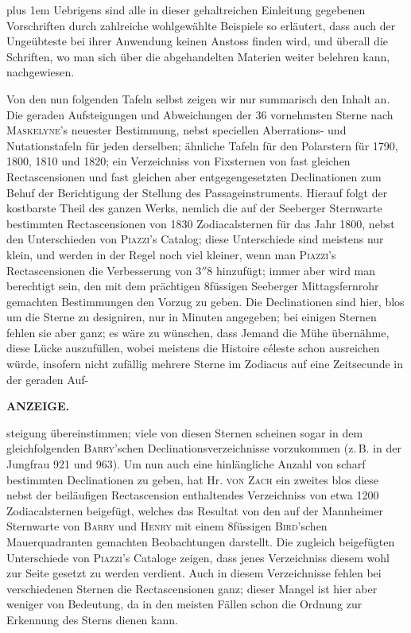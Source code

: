 \begingroup\rightskip=0pt plus 1em
Uebrigens sind alle in dieser gehaltreichen Einleitung gegebenen Vorschriften durch zahlreiche wohlgewählte Beispiele so erläutert, dass auch der Ungeübteste bei ihrer Anwendung keinen Anstoss finden wird, und überall die Schriften, wo man sich über die abgehandelten Materien weiter belehren kann, nachgewiesen.\par\endgroup

Von den nun folgenden Tafeln selbst zeigen wir nur summarisch den Inhalt an. Die geraden Aufsteigungen und Abweichungen der 36 vornehmsten Sterne nach \textsc{Maskelyne}'s neuester Bestimmung, nebst speciellen Aberrations- und Nutationstafeln für jeden derselben; ähnliche Tafeln für den Polarstern für 1790, 1800, 1810 und 1820; ein Verzeichniss von Fixsternen von fast gleichen Rectascensionen und fast gleichen aber entgegengesetzten Declinationen zum Behuf der Berichtigung der Stellung des Passageinstruments. Hierauf folgt der kostbarste Theil des ganzen Werks, nemlich die auf der Seeberger Sternwarte bestimmten Rectascensionen von 1830 Zodiacalsternen für das Jahr 1800, nebst den Unterschieden von \textsc{Piazzi}'s Catalog; diese Unterschiede sind meistens nur klein, und werden in der Regel noch viel kleiner, wenn man \textsc{Piazzi}'s Rectascensionen die Verbesserung von $3''8$ hinzufügt; immer aber wird man berechtigt sein, den mit dem prächtigen 8füssigen Seeberger Mittagsfernrohr gemachten Bestimmungen den Vorzug zu geben. Die Declinationen sind hier, blos um die Sterne zu designiren, nur in Minuten angegeben; bei einigen Sternen fehlen sie aber ganz; es wäre zu wünschen, dass Jemand die Mühe übernähme, diese Lücke auszufüllen, wobei meistens die Histoire céleste schon ausreichen würde, insofern nicht zufällig mehrere Sterne im Zodiacus auf eine Zeitsecunde in der geraden Auf-\par
\clearpage
\noindent{}%
%
\parbox[t]{\dimexpr\linewidth-24mm\relax}{\centering\footnotesize\bfseries ANZEIGE.\par}%
\makebox[12mm][r]{}\par\nobreak\medskip
\noindent steigung übereinstimmen; viele von diesen Sternen scheinen sogar in dem gleichfolgenden \textsc{Barry}'schen Declinationsverzeichnisse vorzukommen (z.\,B. in der Jungfrau 921 und 963). Um nun auch eine hinlängliche Anzahl von scharf bestimmten Declinationen zu geben, hat Hr. \textsc{von Zach} ein zweites blos diese nebst der beiläufigen Rectascension enthaltendes Verzeichniss von etwa 1200 Zodiacalsternen beigefügt, welches das Resultat von den auf der Mannheimer Sternwarte von \textsc{Barry} und \textsc{Henry} mit einem 8füssigen \textsc{Bird}'schen Mauerquadranten gemachten Beobachtungen darstellt. Die zugleich beigefügten Unterschiede von \textsc{Piazzi}'s Cataloge zeigen, dass jenes Verzeichniss diesem wohl zur Seite gesetzt zu werden verdient. Auch in diesem Verzeichnisse fehlen bei verschiedenen Sternen die Rectascensionen ganz; dieser Mangel ist hier aber weniger von Bedeutung, da in den meisten Fällen schon die Ordnung zur Erkennung des Sterns dienen kann.

